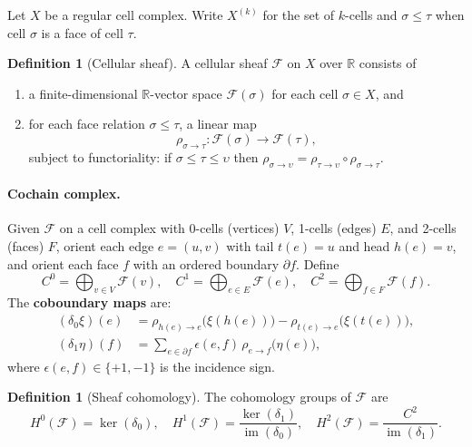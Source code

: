 \documentclass[11pt]{article}
\theoremstyle{plain}
\theoremstyle{definition}
\newtheorem{definition}[theorem]{Definition}
\newcommand{\Fsh}{\mathcal{F}}         %
\newcommand{\Czero}{C^{0}}
\newcommand{\Cone}{C^{1}}
\newcommand{\Ctwo}{C^{2}}
\newcommand{\Hzero}{H^{0}}
\newcommand{\Hone}{H^{1}}
\newcommand{\Htwo}{H^{2}}
\newcommand{\deltazero}{\delta_{0}}
\newcommand{\deltaone}{\delta_{1}}
\newcommand{\RR}{\mathbb{R}}
\newcommand{\im}{\operatorname{im}}
\begin{document}
Let $X$ be a regular cell complex.  Write $X^{(k)}$ for the set of
$k$-cells and $\sigma \leq \tau$ when cell $\sigma$ is a face of cell
$\tau$.

\begin{definition}[Cellular sheaf]\label{def:sheaf}
A cellular sheaf $\Fsh$ on $X$ over $\RR$ consists of
\begin{enumerate}
  \item a finite-dimensional $\RR$-vector space $\Fsh(\sigma)$ for each cell
        $\sigma \in X$, and
  \item for each face relation $\sigma \le \tau$, a linear map
  \[
    \rho_{\sigma\to\tau} \colon \Fsh(\sigma) \to \Fsh(\tau),
  \]
  subject to functoriality: if $\sigma \le \tau \le \upsilon$ then
  $\rho_{\sigma\to\upsilon} = \rho_{\tau\to\upsilon}\circ \rho_{\sigma\to\tau}$.
\end{enumerate}
\end{definition}

\paragraph{Cochain complex.}
Given $\Fsh$ on a cell complex with 0-cells (vertices) $V$, 1-cells (edges)
$E$, and 2-cells (faces) $F$, orient each edge $e = (u,v)$ with tail
$t(e) = u$ and head $h(e) = v$, and orient each face $f$ with an ordered
boundary $\partial f$.  Define
\[
  \Czero = \bigoplus_{v \in V} \Fsh(v), \quad
  \Cone  = \bigoplus_{e \in E} \Fsh(e), \quad
  \Ctwo  = \bigoplus_{f \in F} \Fsh(f).
\]
The \textbf{coboundary maps} are:
\begin{align}
  (\deltazero \xi)(e) &= \rho_{h(e)\to e}\bigl(\xi(h(e))\bigr)
                       - \rho_{t(e)\to e}\bigl(\xi(t(e))\bigr),
                       \label{eq:delta0} \\
  (\deltaone \eta)(f) &= \sum_{e \in \partial f} \epsilon(e,f)\,
                         \rho_{e\to f}\bigl(\eta(e)\bigr),
                       \label{eq:delta1}
\end{align}
where $\epsilon(e,f) \in \{+1,-1\}$ is the incidence sign.

\begin{definition}[Sheaf cohomology]\label{def:cohomology}
The cohomology groups of $\Fsh$ are
\[
  \Hzero(\Fsh) = \ker(\deltazero), \quad
  \Hone(\Fsh)  = \frac{\ker(\deltaone)}{\im(\deltazero)}, \quad
  \Htwo(\Fsh)  = \frac{\Ctwo}{\im(\deltaone)}.
\]
\end{definition}
\end{document}
